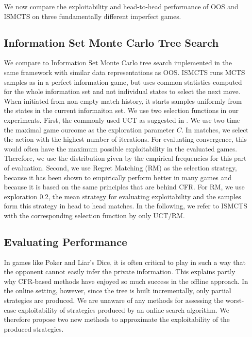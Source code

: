 \documentclass{aamas2015}
\begin{document}
We now compare the exploitability  and head-to-head performance
of OOS and ISMCTS on three fundamentally different imperfect games. %


\subsection{Information Set Monte Carlo Tree Search}
We compare to Information Set Monte Carlo tree search implemented in the same framework with similar data representations as OOS. ISMCTS runs MCTS samples as in a perfect information game, but uses common statistics computed for the whole information set and not individual states to select the next move. When initiated from non-empty match history, it starts samples uniformly from the states in the current informaiton set. We use two selection functions in our experiments. First, the commonly used UCT as suggested in \cite{Cowling12ISMCTS}. We use two time the maximal game ourcome as the exploration parameter $C$. In matches, we select the action with the highest number of iterations. For evaluating convergence, this would often have the maximum possible exploitability in the evaluated games. Therefore, we use the distribution given by the empirical frequencies for this part of evaluation. Second, we use Regret Matching (RM) as the selection strategy, because it has been shown to empirically perform better in many games \cite{Lisy14selection} and because it is based on the same principles that are behind CFR. For RM, we use exploration $0.2$, the mean strategy for evaluating exploitability and the samples form this strategy in head to head matches. In the following, we refer to ISMCTS with the corresponding selection function by only UCT/RM.

\subsection{Evaluating Performance}\label{sec:evaluating}

In games like Poker and Liar's Dice, it is often critical to play in such a way that the opponent 
cannot easily infer the private information. This explains partly why CFR-based methods have 
enjoyed so much success in the offline approach. 
In the online setting, however, since the tree is built incrementally, only partial strategies
are produced. 
We are unaware of any methods for assessing the worst-case exploitability of strategies 
produced by an online search algorithm. 
We therefore propose two new methods to approximate the exploitability of the produced strategies. 
\end{document}
